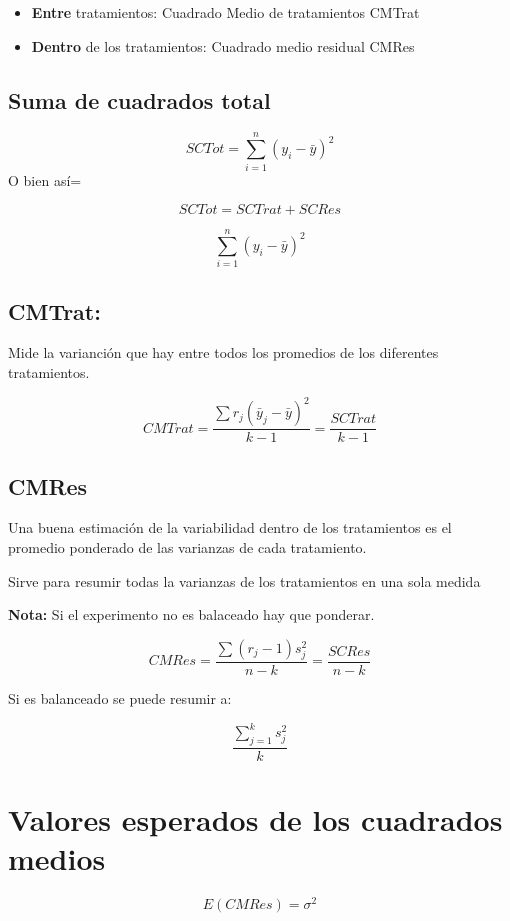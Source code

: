 \documentclass[
]{article}
\providecommand{\tightlist}{%
  \setlength{\itemsep}{0pt}\setlength{\parskip}{0pt}}
\begin{document}
\begin{itemize}
\tightlist
\item
  \textbf{Entre} tratamientos: Cuadrado Medio de tratamientos CMTrat
\item
  \textbf{Dentro} de los tratamientos: Cuadrado medio residual CMRes
\end{itemize}

\subsection{Suma de cuadrados total}\label{suma-de-cuadrados-total}

\[SCTot=\sum^n_{i=1}(y_i-\bar y )^2\] O bien así=

\[
SCTot=SCTrat+SCRes
\]

\[
\sum^n_{i=1}( y_i-\bar y)^2
\]

\subsection{CMTrat:}\label{cmtrat}

Mide la varianción que hay entre todos los promedios de los diferentes
tratamientos.

\[
CMTrat= \frac{\sum r_j(\bar y_j-\bar y)^2}{k-1}=\frac{SCTrat}{k-1}
\]

\subsection{CMRes}\label{cmres}

Una buena estimación de la variabilidad dentro de los tratamientos es el
promedio ponderado de las varianzas de cada tratamiento.

Sirve para resumir todas la varianzas de los tratamientos en una sola
medida

\textbf{Nota:} Si el experimento no es balaceado hay que ponderar.

\[
CMRes=\frac{\sum(r_j-1)s^2_j}{n-k} = \frac{SCRes}{n-k}
\]

Si es balanceado se puede resumir a:

\[
\frac{\sum^k_{j=1}s^2_j}{k}
\]

\section{Valores esperados de los cuadrados
medios}\label{valores-esperados-de-los-cuadrados-medios}

\[
E(CMRes)=\sigma^2
\]
\end{document}

